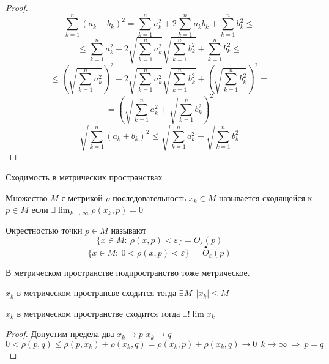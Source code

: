 \begin{proof}
  $$
  \sum_{k=1}^n (a_k + b_k)^2 = \sum_{k=1}^n a_k^2 +
  2\sum_{k=1}^n a_k b_k + \sum_{k=1}^n b_k^2 \le
  $$
  $$
  \le \sum_{k=1}^n a_k^2 + 2\sqrt{\sum_{k=1}^n a_k^2} \sqrt{\sum_{k=1}^n b_k^2}
  + \sum_{k=1}^n b_k^2 \le
  $$
  $$
  \le \left( \sqrt{\sum_{k=1}^n a_k^2} \right)^2 + 2\sqrt{\sum_{k=1}^n a_k^2}
  \sqrt{\sum_{k=1}^n b_k^2} + \left( \sqrt{\sum_{k=1}^n b_k^2} \right)^2 =
  $$
  $$
  = \left( \sqrt{\sum_{k=1}^n a_k^2} + \sqrt{\sum_{k=1}^n b_k^2} \right)^2
  $$
  $$
  \sqrt{\sum_{k=1}^n (a_k + b_k)^2} \le \sqrt{\sum_{k=1}^n a_k^2} +
  \sqrt{\sum_{k=1}^n b_k^2}
  $$
\end{proof}

\begin{title}[\Large]
  Сходимость в метрических пространствах
\end{title}

\begin{define}
  Множество $M$ с метрикой $\rho$ последовательность $x_k \in M$ называется
  сходящейся к $p \in M$ если $\exists \lim_{k \to \infty} \rho(x_k, p)
  = 0$
\end{define}

\begin{define}
  Окрестностью точки $p \in M$ называют
  $$
  \{ x \in M: ~ \rho(x, p) < \varepsilon \} = O_{\varepsilon}(p)
  $$
  $$
  \{ x \in M: ~ 0 < \rho(x, p) < \varepsilon \} = ~
  \stackrel{\bullet}{O}_{\varepsilon}(p)
  $$
\end{define}

\begin{block}[Свойство]
  В метрическом пространстве подпространство тоже метрическое.
\end{block}

\begin{theorem}
  $x_k$ в метрическом пространсве сходится тогда $\exists M ~~ |x_k| \le M$
\end{theorem}

\begin{theorem}
  $x_k$ в метрическом пространстве сходится тогда $\exists ! \lim x_k$
\end{theorem}

\begin{proof}
  Допустим предела два $x_k \to p$ $x_k \to q$
  $$
  0 < \rho(p, q) \le \rho(p, x_k) + \rho(x_k, q) = \rho(x_k, p) + \rho(x_k, q)
  \to 0 ~~ k \to \infty ~ \Rightarrow ~ p = q
  $$
\end{proof}

